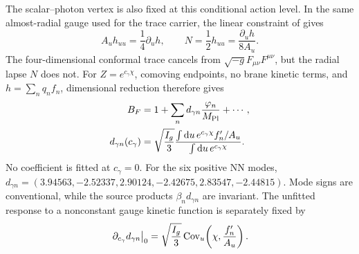 \documentclass[10pt]{article}
\newcommand{\dd}{\mathrm{d}}
\begin{document}
The scalar--photon vertex is also fixed at this conditional action level.  In
the same almost-radial gauge used for the trace carrier, the linear constraint
of \citet{Arutyunov2000} gives
\begin{equation}
 A_u h_{uu}=\frac14\partial_u h,
 \qquad N=\frac12h_{uu}=\frac{\partial_u h}{8A_u}.
 \label{eq:lapseconstraint}
\end{equation}
The four-dimensional conformal trace cancels from
$\sqrt{-g}F_{\mu\nu}F^{\mu\nu}$, but the radial lapse $N$ does not.  For
$Z=e^{c_\gamma\chi}$, comoving endpoints, no brane kinetic terms, and
$h=\sum_nq_nf_n$, dimensional reduction therefore gives
\begin{align}
 B_F&=1+\sum_n d_{\gamma n}\frac{\varphi_n}{M_{\rm Pl}}+\cdots,\nonumber\\
 d_{\gamma n}(c_\gamma)&=\sqrt{\frac{I_g}{3}}
 \frac{\int\dd u\,e^{c_\gamma\chi}f_n'/A_u}
 {\int\dd u\,e^{c_\gamma\chi}} .
 \label{eq:dgamma}
\end{align}
No coefficient is fitted at $c_\gamma=0$.  For the six positive NN modes,
$d_{\gamma n}=(3.94563,-2.52337,2.90124,-2.42675,2.83547,-2.44815)$.
Mode signs are conventional, while the source products
$\beta_nd_{\gamma n}$ are invariant.  The unfitted response to a nonconstant
gauge kinetic function is separately fixed by
\begin{equation}
 \left.\partial_{c_\gamma}d_{\gamma n}\right|_0
 =\sqrt{\frac{I_g}{3}}\,
 {\rm Cov}_u\!\left(\chi,\frac{f_n'}{A_u}\right).
 \label{eq:dgammaSlope}
\end{equation}
\end{document}
